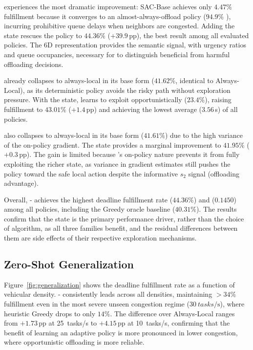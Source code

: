  experiences the most dramatic improvement: SAC-Base achieves only $4.47\%$ fulfillment because it converges to an almost-always-offload policy ($94.9\%$ ), incurring prohibitive queue delays when neighbors are congested. Adding the  state rescues the policy to $44.36\%$ ($\mathbf{+39.9}$\,pp), the best result among all evaluated policies. The 6D representation provides the semantic signal, with urgency ratios and queue occupancies, necessary for  to distinguish beneficial from harmful offloading decisions.

 already collapses to always-local in its base form ($41.62\%$, identical to Always-Local), as its deterministic policy avoids the risky  path without exploration pressure. With the  state,  learns to exploit  opportunistically ($23.4\%$), raising fulfillment to $43.01\%$ ($+1.4$\,pp) and achieving the lowest average  ($3.56$\,s) of all policies.

 also collapses to always-local in its base form ($41.61\%$) due to the high variance of the on-policy gradient. The  state provides a marginal improvement to $41.95\%$ ($+0.3$\,pp). The gain is limited because 's on-policy nature prevents it from fully exploiting the richer state, as variance in gradient estimates still pushes the policy toward the safe local action despite the informative $s_2$ signal (offloading advantage).

Overall, - achieves the highest deadline fulfillment rate ($44.36\%$) and  ($0.1450$) among all policies, including the Greedy oracle baseline ($40.31\%$). The results confirm that the  state is the primary performance driver, rather than the choice of  algorithm, as all three families benefit, and the residual differences between them are side effects of their respective exploration mechanisms.

\subsection{Zero-Shot Generalization}

Figure~\ref{fig:generalization} shows the deadline fulfillment rate as a function of vehicular density. - consistently leads across all densities, maintaining $>34\%$ fulfillment even in the most severe unseen congestion regime ($\SI{30}{tasks\per\second}$), where heuristic Greedy drops to only $14\%$. The difference over Always-Local ranges from $+1.73$\,pp at 25~tasks/s to $+4.15$\,pp at 10~tasks/s, confirming that the benefit of learning an adaptive policy is more pronounced in lower congestion, where opportunistic  offloading is more reliable.

